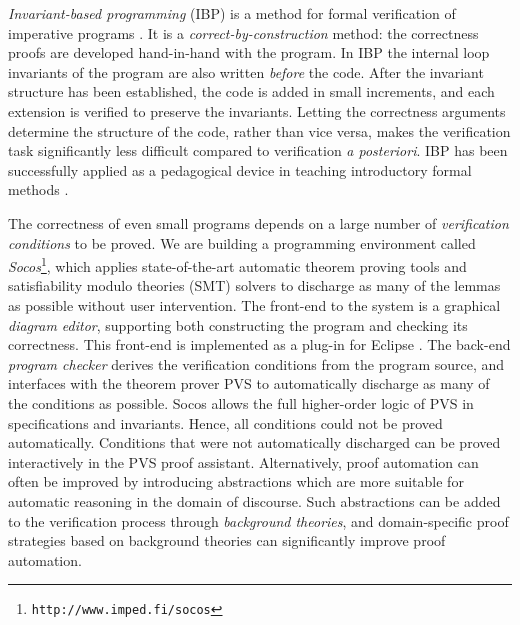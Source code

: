 \documentclass[english,submission]{eptcs}
\begin{document}
\emph{Invariant-based programming }(IBP) is a method for formal
verification of imperative programs \cite{jBack08b}. It is a
\emph{correct-by-construction }method: the correctness proofs are
developed hand-in-hand with the program. In IBP the internal loop
invariants of the program are also written \emph{before} the code.
After the invariant structure has been established, the code is added
in small increments, and each extension is verified to preserve the
invariants. Letting the correctness arguments determine the structure
of the code, rather than vice versa, makes the verification task
significantly less difficult compared to verification \emph{a
  posteriori}. IBP has been successfully applied as a pedagogical
device in teaching introductory formal methods \cite{inpBaErMa07}.

The correctness of even small programs depends on a large number of
\emph{verification conditions} to be proved. We are building a programming
environment called \emph{Socos}\footnote{\texttt{http://www.imped.fi/socos}}, which applies state-of-the-art automatic theorem proving tools and
satisfiability modulo theories (SMT) solvers to discharge as many
of the lemmas as possible without user intervention. The front-end
to the system is a graphical \emph{diagram editor}, supporting both
constructing the program and checking its correctness. This front-end
is implemented as a plug-in for Eclipse \cite{eclipse}. The back-end
\emph{program checker} derives the verification conditions from the
program source, and interfaces with the theorem prover PVS \cite{owre96pvs}
to automatically discharge as many of the conditions as possible.
Socos allows the full higher-order logic of PVS in specifications
and invariants. Hence, all conditions could not be proved automatically.
Conditions that were not automatically discharged can be proved interactively
in the PVS proof assistant. Alternatively, proof automation can often
be improved by introducing abstractions which are more suitable for
automatic reasoning in the domain of discourse. Such abstractions
can be added to the verification process through \emph{background
theories}, and domain-specific proof strategies based on background
theories can significantly improve proof automation.
\end{document}
